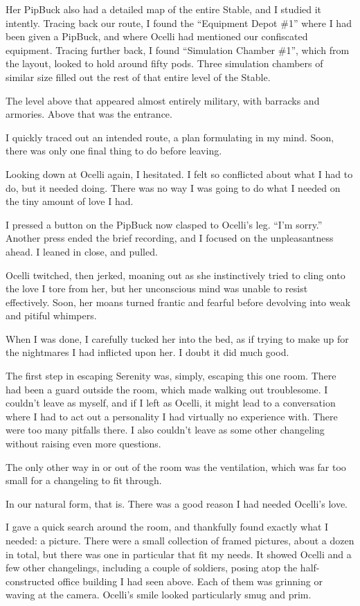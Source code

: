 Her PipBuck also had a detailed map of the entire Stable, and I studied it intently. Tracing back our route, I found the “Equipment Depot \#1” where I had been given a PipBuck, and where Ocelli had mentioned our confiscated equipment. Tracing further back, I found “Simulation Chamber \#1”, which from the layout, looked to hold around fifty pods. Three simulation chambers of similar size filled out the rest of that entire level of the Stable.

The level above that appeared almost entirely military, with barracks and armories. Above that was the entrance.

I quickly traced out an intended route, a plan formulating in my mind. Soon, there was only one final thing to do before leaving.

Looking down at Ocelli again, I hesitated. I felt so conflicted about what I had to do, but it needed doing. There was no way I was going to do what I needed on the tiny amount of love I had.

I pressed a button on the PipBuck now clasped to Ocelli’s leg. “I’m sorry.” Another press ended the brief recording, and I focused on the unpleasantness ahead. I leaned in close, and pulled.

Ocelli twitched, then jerked, moaning out as she instinctively tried to cling onto the love I tore from her, but her unconscious mind was unable to resist effectively. Soon, her moans turned frantic and fearful before devolving into weak and pitiful whimpers.

When I was done, I carefully tucked her into the bed, as if trying to make up for the nightmares I had inflicted upon her. I doubt it did much good.

The first step in escaping Serenity was, simply, escaping this one room. There had been a guard outside the room, which made walking out troublesome. I couldn’t leave as myself, and if I left as Ocelli, it might lead to a conversation where I had to act out a personality I had virtually no experience with. There were too many pitfalls there. I also couldn’t leave as some other changeling without raising even more questions.

The only other way in or out of the room was the ventilation, which was far too small for a changeling to fit through.

In our natural form, that is. There was a good reason I had needed Ocelli’s love.

I gave a quick search around the room, and thankfully found exactly what I needed: a picture. There were a small collection of framed pictures, about a dozen in total, but there was one in particular that fit my needs. It showed Ocelli and a few other changelings, including a couple of soldiers, posing atop the half-constructed office building I had seen above. Each of them was grinning or waving at the camera. Ocelli’s smile looked particularly smug and prim.

